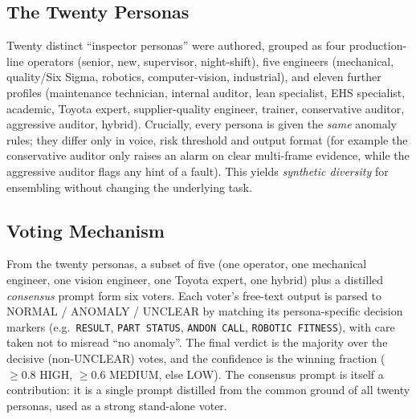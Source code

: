 \subsection{The Twenty Personas}
Twenty distinct ``inspector personas'' were authored, grouped as four production-line
operators (senior, new, supervisor, night-shift), five engineers (mechanical, quality/Six
Sigma, robotics, computer-vision, industrial), and eleven further profiles (maintenance
technician, internal auditor, lean specialist, EHS specialist, academic, Toyota expert,
supplier-quality engineer, trainer, conservative auditor, aggressive auditor, hybrid).
Crucially, every persona is given the \emph{same} anomaly rules; they differ only in
voice, risk threshold and output format (for example the conservative auditor only raises
an alarm on clear multi-frame evidence, while the aggressive auditor flags any hint of a
fault). This yields \emph{synthetic diversity} for ensembling without changing the
underlying task.

\subsection{Voting Mechanism}
From the twenty personas, a subset of five (one operator, one mechanical engineer, one
vision engineer, one Toyota expert, one hybrid) plus a distilled \emph{consensus} prompt
form six voters. Each voter's free-text output is parsed to NORMAL / ANOMALY / UNCLEAR by
matching its persona-specific decision markers (e.g.\ \texttt{RESULT}, \texttt{PART
STATUS}, \texttt{ANDON CALL}, \texttt{ROBOTIC FITNESS}), with care taken not to misread
``no anomaly''. The final verdict is the majority over the decisive (non-UNCLEAR) votes,
and the confidence is the winning fraction ($\geq 0.8$ HIGH, $\geq 0.6$ MEDIUM, else LOW).
The consensus prompt is itself a contribution: it is a single prompt distilled from the
common ground of all twenty personas, used as a strong stand-alone voter.

